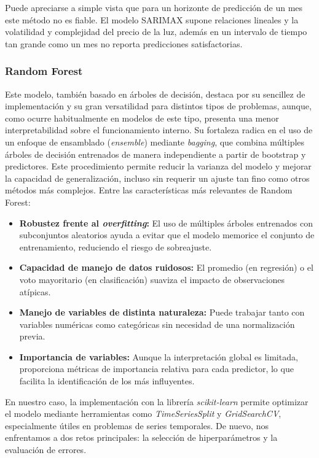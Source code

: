 Puede apreciarse a simple vista que para un horizonte de predicción de un mes este método no es fiable. El modelo SARIMAX supone relaciones lineales y la volatilidad y complejidad del precio de la luz, además en un intervalo de tiempo tan grande como un mes no reporta predicciones satisfactorias.
%
%
%
\subsubsection{Random Forest}
%
%
%
Este modelo, también basado en árboles de decisión, destaca por su sencillez de implementación y su gran versatilidad para distintos tipos de problemas, aunque, como ocurre habitualmente en modelos de este tipo, presenta una menor interpretabilidad sobre el funcionamiento interno. Su fortaleza radica en el uso de un enfoque de ensamblado (\textit{ensemble}) mediante \textit{bagging}, que combina múltiples árboles de decisión entrenados de manera independiente a partir de bootstrap y predictores. Este procedimiento permite reducir la varianza del modelo y mejorar la capacidad de generalización, incluso sin requerir un ajuste tan fino como otros métodos más complejos. Entre las características más relevantes de Random Forest:

\begin{itemize}
    \item \textbf{Robustez frente al \textit{overfitting}:} El uso de múltiples árboles entrenados con subconjuntos aleatorios ayuda a evitar que el modelo memorice el conjunto de entrenamiento, reduciendo el riesgo de sobreajuste.
    \item \textbf{Capacidad de manejo de datos ruidosos:} El promedio (en regresión) o el voto mayoritario (en clasificación) suaviza el impacto de observaciones atípicas.
    \item \textbf{Manejo de variables de distinta naturaleza:} Puede trabajar tanto con variables numéricas como categóricas sin necesidad de una normalización previa.
    \item \textbf{Importancia de variables:} Aunque la interpretación global es limitada, proporciona métricas de importancia relativa para cada predictor, lo que facilita la identificación de los más influyentes.
\end{itemize}

En nuestro caso, la implementación con la librería \textit{scikit-learn} permite optimizar el modelo mediante herramientas como \textit{TimeSeriesSplit} y \textit{GridSearchCV}, especialmente útiles en problemas de series temporales. De nuevo, nos enfrentamos a dos retos principales: la selección de hiperparámetros y la evaluación de errores.

